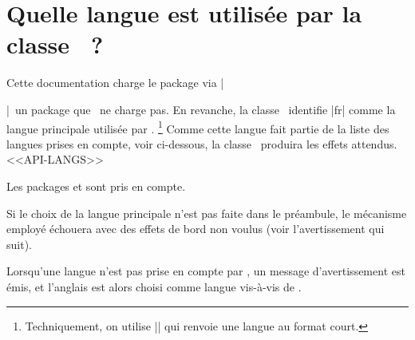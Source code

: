 \documentclass{tutodoc}
\begin{document}
\section{Quelle langue est utilisée par la classe \thisproj\ ?}

Cette documentation charge le package  via \tdocinlatex|\usepackage[english]{babel}|\, un package que \thisproj\ ne charge pas.
En revanche, la classe \thisproj\ identifie \tdocinlatex|fr| comme la langue principale utilisée par .%
\footnote{
    Techniquement, on utilise \tdocinlatex|| qui renvoie une langue au format court.
}
Comme cette langue fait partie de la liste des langues prises en compte, voir ci-dessous, la classe \thisproj\ produira les effets attendus.
<<API-LANGS>>


\begin{tdocnote}
    Les packages  et  sont pris en compte.
\end{tdocnote}


\begin{tdoccaut}
    Si le choix de la langue principale n'est pas faite dans le préambule, le mécanisme employé échouera avec des effets de bord non voulus (voir l'avertissement qui suit).
\end{tdoccaut}


\begin{tdocwarn}
    Lorsqu'une langue n'est pas prise en compte par \thisproj, un message d'avertissement est émis, et l'anglais est alors choisi comme langue vis-à-vis de \thisproj.
\end{tdocwarn}
\end{document}
